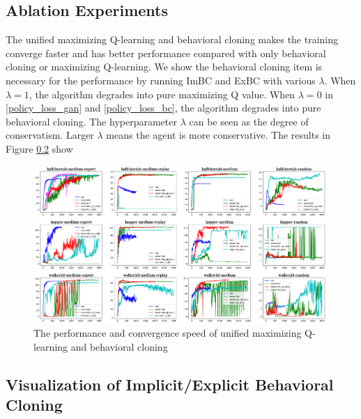 \documentclass[nohyperref]{article}
\theoremstyle{plain}
\theoremstyle{definition}
\theoremstyle{remark}
\begin{document}
\subsection{Ablation Experiments}
The unified maximizing Q-learning and behavioral cloning makes the training converge faster and has better performance compared with only behavioral cloning or maximizing Q-learning. 
We show the behavioral cloning item is necessary for the performance by running ImBC and ExBC with various $\lambda$. When $\lambda = 1$, the algorithm degrades into pure maximizing Q value. When $\lambda = 0$ in \eqref{policy_loss_gan} and \eqref{policy_loss_bc}, the algorithm degrades into pure behavioral cloning. The hyperparameter $\lambda$ can be seen as the degree of conservatism. Larger $\lambda$ means the agent is more conservative. The results in Figure \ref{} show 


\begin{figure}[htbp]
  \centering
  \includegraphics[width=0.99\textwidth]{converge.png}
  \caption{The performance and convergence speed of unified maximizing Q-learning and behavioral cloning}
  \label{fig:conv_speed}
\end{figure}

\subsection{Visualization of Implicit/Explicit Behavioral Cloning }
\end{document}
